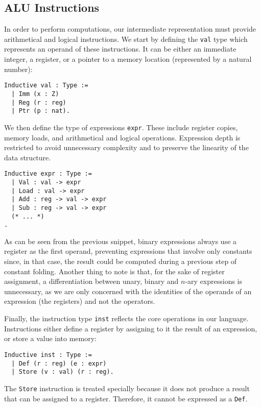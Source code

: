 \subsection{ALU Instructions}

In order to perform computations, our intermediate representation must provide arithmetical and logical instructions.
We start by defining the \texttt{val} type which represents an operand of these instructions. It can be either an immediate integer, a register, or a pointer to a memory location (represented by a natural number):

\begin{lstlisting}[style=Coq]
Inductive val : Type :=
  | Imm (x : Z)
  | Reg (r : reg)
  | Ptr (p : nat).
\end{lstlisting}

We then define the type of expressions \texttt{expr}. These include register copies, memory loads, and arithmetical and logical operations. Expression depth is restricted to avoid unnecessary complexity and to preserve the linearity of the data structure.

\begin{lstlisting}[style=Coq]
Inductive expr : Type :=
  | Val : val -> expr
  | Load : val -> expr
  | Add : reg -> val -> expr
  | Sub : reg -> val -> expr
  (* ... *)
.
\end{lstlisting}

As can be seen from the previous snippet, binary expressions always use a register as the first operand, preventing expressions that involve only constants since, in that case, the result could be computed during a previous step of constant folding. Another thing to note is that, for the sake of register assignment, a differentiation between unary, binary and $n$-ary expressions is unnecessary, as we are only concerned with the identities of the operands of an expression (the registers) and not the operators.

Finally, the instruction type \texttt{inst} reflects the core operations in our language. Instructions either define a register by assigning to it the result of an expression, or store a value into memory:

\begin{lstlisting}[style=Coq]
Inductive inst : Type :=
  | Def (r : reg) (e : expr)
  | Store (v : val) (r : reg).
\end{lstlisting}

The \texttt{Store} instruction is treated specially because it does not produce a result that can be assigned to a register. Therefore, it cannot be expressed as a \texttt{Def}.

